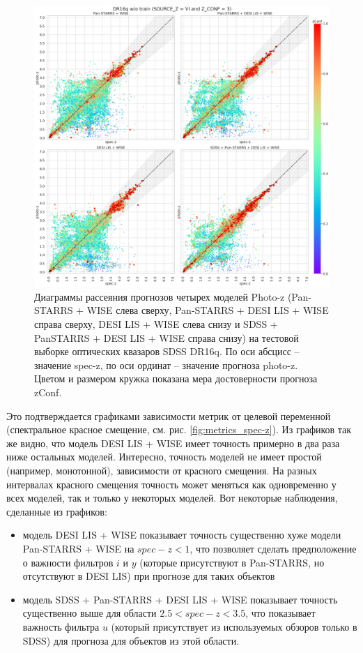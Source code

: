 \documentclass[fleqn,usenatbib]{mnras}
\begin{document}
\begin{figure}[ht]
    \centering
    \includegraphics[width=0.9\linewidth]{images/scatterplots-dr16q-wo-train.png}
    \caption{Диаграммы рассеяния прогнозов четырех моделей Photo-z (Pan-STARRS + WISE слева сверху, Pan-STARRS + DESI LIS + WISE справа сверху, DESI LIS + WISE слева снизу и SDSS + PanSTARRS + DESI LIS + WISE справа снизу) на тестовой выборке оптических квазаров SDSS DR16q. По оси абсцисс -- значение spec-z, по оси ординат -- значение прогноза photo-z. Цветом и размером кружка показана мера достоверности прогноза zConf.}
    \label{fig:dr16q_wo_train}
\end{figure}

Это подтверждается графиками зависимости метрик от целевой переменной (спектральное красное смещение, см. рис. \ref{fig:metrics_spec-z}). Из графиков так же видно, что модель DESI LIS + WISE имеет точность примерно в два раза ниже остальных моделей. Интересно, точность моделей не имеет простой (например, монотонной), зависимости от красного смещения. На разных интервалах красного смещения точность может меняться как одновременно у всех моделей, так и только у некоторых моделей. Вот некоторые наблюдения, сделанные из графиков:
\begin{itemize}
    \item модель DESI LIS + WISE показывает точность существенно хуже модели Pan-STARRS + WISE на $spec-z < 1$, что позволяет сделать предположение о важности фильтров $i$ и $y$ (которые присутствуют в Pan-STARRS, но отсутствуют в DESI LIS) при прогнозе для таких объектов
    \item модель SDSS + Pan-STARRS + DESI LIS + WISE показывает точность существенно выше для области $2.5 < spec-z < 3.5$, что показывает важность фильтра $u$ (который присутствует из используемых обзоров только в SDSS) для прогноза для объектов из этой области.
\end{itemize}
\end{document}
